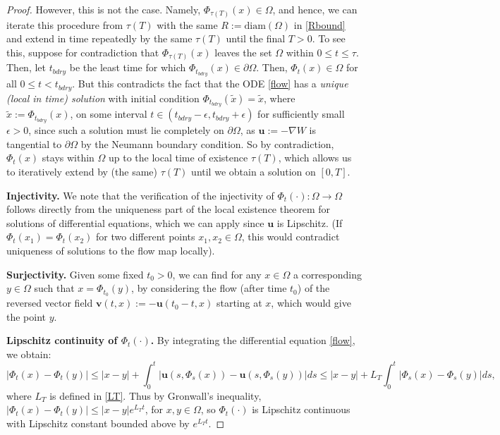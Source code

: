 \documentclass[12pt]{article}
\newcommand{\bd}{\boldsymbol}
\theoremstyle{plain}
\begin{document}
\begin{proof}
However, this is not the case. Namely, $\Phi_{\tau(T)}(x) \in \Omega$, and hence, we can iterate this procedure from $\tau(T)$ with the same $R := \text{diam}(\Omega)$ in \eqref{Rbound} and extend in time repeatedly by the same $\tau(T)$ until the final $T > 0$. To see this, suppose for contradiction that $\Phi_{\tau(T)}(x)$ leaves the set $\Omega$ within $0 \le t \le \tau$. Then, let $t_{bdry}$ be the least time for which $\Phi_{t_{bdry}}(x) \in \partial \Omega$. Then, $\Phi_{t}(x) \in \Omega$ for all $0 \le t < t_{bdry}$. But this contradicts the fact that the ODE \eqref{flow} has a \textit{unique (local in time) solution} with initial condition $\Phi_{t_{bdry}}(\tilde{x}) = \tilde{x}$, where $\tilde{x} := \Phi_{t_{bdry}}(x)$, on some interval $t \in (t_{bdry} - \epsilon, t_{bdry} + \epsilon)$ for sufficiently small $\epsilon > 0$, since such a solution must lie completely on $\partial \Omega$, as $\bd{u} := -\nabla W$ is tangential to $\partial \Omega$ by the Neumann boundary condition. So by contradiction, $\Phi_{t}(x)$ stays within $\Omega$ up to the local time of existence $\tau(T)$, which allows us to iteratively extend by (the same) $\tau(T)$ until we obtain a solution on $[0, T]$. 

\medskip

\noindent \textbf{Injectivity.} We note that the verification of the injectivity of $\Phi_{t}(\cdot): \Omega \to \Omega$ follows directly from the uniqueness part of the local existence theorem for solutions of differential equations, which we can apply since $\bd{u}$ is Lipschitz. (If $\Phi_{t}(x_1) = \Phi_{t}(x_2)$ for two different points $x_1, x_2 \in \Omega$, this would contradict uniqueness of solutions to the flow map locally).

\medskip

\noindent \textbf{Surjectivity.} Given some fixed $t_0 > 0$, we can find for any $x \in \Omega$ a corresponding $y \in \Omega$ such that $x = \Phi_{t_0}(y)$, by considering the flow (after time $t_0$) of the reversed vector field $\bd{v}(t, x) := -\bd{u}(t_0 - t, x)$ starting at $x$, which would give the point $y$.

\medskip

\noindent \textbf{Lipschitz continuity of $\Phi_{t}(\cdot)$.} By integrating the differential equation \eqref{flow}, we obtain:
\begin{equation*}
|\Phi_{t}(x) - \Phi_{t}(y)| \le |x - y| + \int_{0}^{t} |\bd{u}(s, \Phi_{s}(x)) - \bd{u}(s, \Phi_{s}(y))| ds \le |x - y| + L_{T} \int_{0}^{t} |\Phi_{s}(x) - \Phi_{s}(y)| ds,
\end{equation*}
where $L_{T}$ is defined in \eqref{LT}. Thus by Gronwall's inequality, $|\Phi_{t}(x) - \Phi_{t}(y)| \le |x - y|e^{L_{T}t}$, for $x, y \in \Omega$, so $\Phi_{t}(\cdot)$ is Lipschitz continuous with Lipschitz constant bounded above by $e^{L_{T}t}$.
\end{proof}
\end{document}
